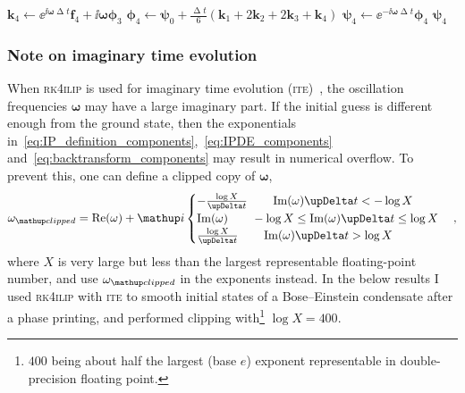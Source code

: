 \begin{breakablealgorithm}
\begin{algorithmic}[1]
        \State $\mathbf{k}_4 \gets \ee^{\ii\mathbf{\omega}\upDelta t}\mathbf{f}_4 + \ii\mathbf{\omega}\mathbf{\phi}_3$
        \State $\mathbf{\phi}_4 \gets
                \mathbf{\psi}_0 + \frac{\upDelta t}{6}\left(\mathbf{k}_1 + 2\mathbf{k}_2 + 2\mathbf{k}_3 + \mathbf{k}_4\right)$
        \State $\mathbf{\psi}_4 \gets \ee^{-\ii\mathbf{\omega}\upDelta t}\mathbf{\phi}_4$
        \State \Return $\mathbf{\psi}_4$
    \EndFunction
    \end{algorithmic}
\end{breakablealgorithm}

\subsubsection{Note on imaginary time evolution}

When \textsc{rk4ilip} is used for imaginary time evolution (\textsc{ite})~\cite{chiofalo2000}, the oscillation frequencies $\mathbf{\omega}$ may have a large imaginary part. If the initial guess is different enough from the ground state, then the exponentials in~\eqref{eq:IP_definition_components},~\eqref{eq:IPDE_components} and~\eqref{eq:backtransform_components} may result in numerical overflow. To prevent this, one can define a clipped copy of $\mathbf{\omega}$,
\begin{align}
\mathbf{\omega}_\up{clipped} = \re(\mathbf{\omega}) + \ii\begin{cases}
-\frac{\log X}{\upDelta t}\qquad \im(\mathbf{\omega})\upDelta t < -\log X\\
\im(\mathbf{\omega})\qquad       -\log X \leq \im(\mathbf{\omega})\upDelta t \leq \log X\\
\frac{\log X}{\upDelta t}\qquad  \im(\mathbf{\omega})\upDelta t > \log X
\end{cases},
\end{align}
where $X$ is very large but less than the largest representable floating-point number, and use $\mathbf{\omega}_\up{clipped}$ in the exponents instead. In the below results I used \textsc{rk4ilip} with \textsc{ite} to smooth initial states of a Bose--Einstein condensate after a phase printing, and performed clipping with\footnote{$400$ being about half the largest (base $e$) exponent representable in double-precision floating point.} $\log X = 400$.


